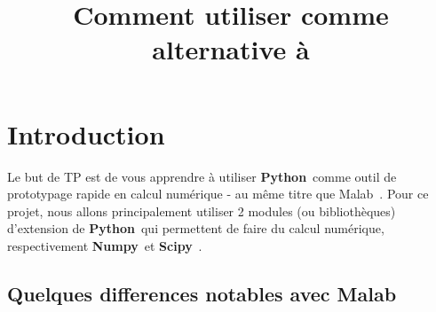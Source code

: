 \documentclass[11pt]{article}
\title{Comment utiliser \python comme alternative à \matlab}
\newcommand{\matlab}{{\ECFTeenSpirit Malab}\ }
\newcommand{\python}{{\bf Python}\ }
\newcommand{\numpy}{{\bf Numpy}\ }
\newcommand{\scipy}{{\bf Scipy}\ }
\begin{document}
\maketitle
\section{Introduction}
  Le but de TP est de vous apprendre à utiliser \python comme outil de prototypage rapide en calcul numérique - au
  même titre que \matlab.
  Pour ce projet, nous allons principalement utiliser 2 modules (ou bibliothèques) d'extension de \python qui
  permettent de faire du calcul numérique, respectivement \numpy et \scipy.

  \subsection{Quelques differences notables avec \matlab}
\end{document}

